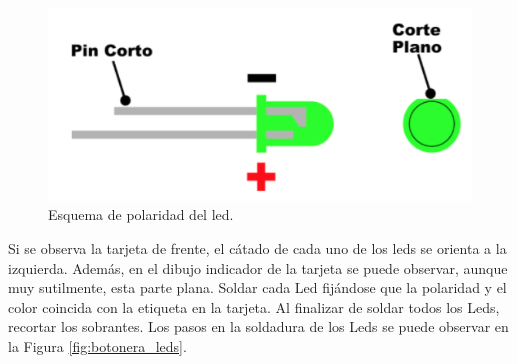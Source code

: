 \documentclass{article}
\begin{document}
\begin{figure}[H]
    \centering
    \includegraphics[width=0.5\columnwidth]{images/Botonera/led0}
    \caption{Esquema de polaridad del led.}
    \label{fig:poladirad_led}
\end{figure}

Si se observa la tarjeta de frente, el cátado de cada uno de los leds se orienta a la izquierda. Además, en el dibujo indicador de la tarjeta se puede observar, aunque muy sutilmente, esta parte plana. Soldar cada Led fijándose que la polaridad y el color coincida con la etiqueta en la tarjeta. Al finalizar de soldar todos los Leds, recortar los sobrantes. Los pasos en la soldadura de los Leds se puede observar en la Figura \ref{fig:botonera_leds}.
\end{document}
